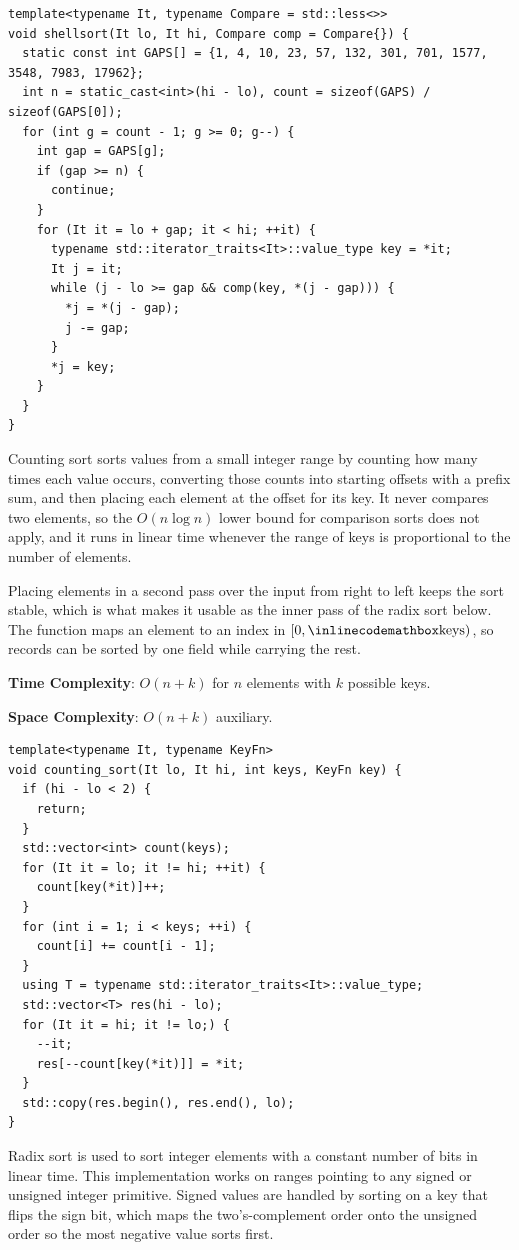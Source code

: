 \begin{lstlisting}[style=cpp]
template<typename It, typename Compare = std::less<>>
void shellsort(It lo, It hi, Compare comp = Compare{}) {
  static const int GAPS[] = {1, 4, 10, 23, 57, 132, 301, 701, 1577, 3548, 7983, 17962};
  int n = static_cast<int>(hi - lo), count = sizeof(GAPS) / sizeof(GAPS[0]);
  for (int g = count - 1; g >= 0; g--) {
    int gap = GAPS[g];
    if (gap >= n) {
      continue;
    }
    for (It it = lo + gap; it < hi; ++it) {
      typename std::iterator_traits<It>::value_type key = *it;
      It j = it;
      while (j - lo >= gap && comp(key, *(j - gap))) {
        *j = *(j - gap);
        j -= gap;
      }
      *j = key;
    }
  }
}
\end{lstlisting}
Counting sort sorts values from a small integer range by counting how many times each value occurs, converting those counts into starting offsets with a prefix sum, and then placing each element at the offset for its key. It never compares two elements, so the $O(n \log n)$ lower bound for comparison sorts does not apply, and it runs in linear time whenever the range of keys is proportional to the number of elements.

Placing elements in a second pass over the input from right to left keeps the sort stable, which is what makes it usable as the inner pass of the radix sort below. The  function maps an element to an index in $[0, {\inlinecodemath{keys}})$, so records can be sorted by one field while carrying the rest.

\textbf{Time Complexity}: $O(n + k)$ for $n$ elements with $k$ possible keys.

\textbf{Space Complexity}: $O(n + k)$ auxiliary.

\begin{lstlisting}[style=cpp]
template<typename It, typename KeyFn>
void counting_sort(It lo, It hi, int keys, KeyFn key) {
  if (hi - lo < 2) {
    return;
  }
  std::vector<int> count(keys);
  for (It it = lo; it != hi; ++it) {
    count[key(*it)]++;
  }
  for (int i = 1; i < keys; ++i) {
    count[i] += count[i - 1];
  }
  using T = typename std::iterator_traits<It>::value_type;
  std::vector<T> res(hi - lo);
  for (It it = hi; it != lo;) {
    --it;
    res[--count[key(*it)]] = *it;
  }
  std::copy(res.begin(), res.end(), lo);
}
\end{lstlisting}
Radix sort is used to sort integer elements with a constant number of bits in linear time. This implementation works on ranges pointing to any signed or unsigned integer primitive. Signed values are handled by sorting on a key that flips the sign bit, which maps the two's-complement order onto the unsigned order so the most negative value sorts first.

